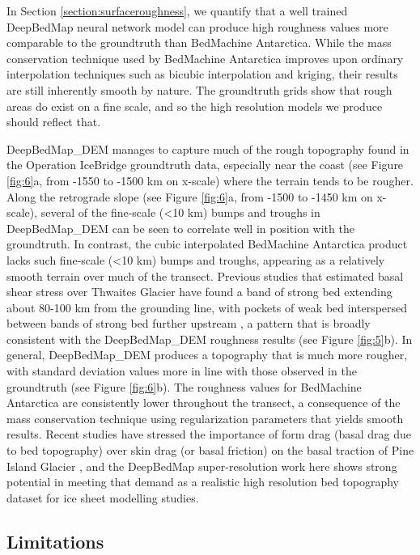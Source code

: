 \documentclass[tc, manuscript]{copernicus}
\begin{document}
In Section \ref{section:surfaceroughness}, we quantify that a well trained DeepBedMap neural network model can produce high roughness values more comparable to the groundtruth than BedMachine Antarctica.
While the mass conservation technique used by BedMachine Antarctica \citep{MorlighemDeepglacialtroughs2019} improves upon ordinary interpolation techniques such as bicubic interpolation and kriging, their results are still inherently smooth by nature.
The groundtruth grids show that rough areas do exist on a fine scale, and so the high resolution models we produce should reflect that.

DeepBedMap\_DEM manages to capture much of the rough topography found in the Operation IceBridge groundtruth data, especially near the coast (see Figure \ref{fig:6}a, from -1550 to -1500 km on x-scale) where the terrain tends to be rougher.
Along the retrograde slope (see Figure \ref{fig:6}a, from -1500 to -1450 km on x-scale), several of the fine-scale (<10 km) bumps and troughs in DeepBedMap\_DEM can be seen to correlate well in position with the groundtruth.
In contrast, the cubic interpolated BedMachine Antarctica product lacks such fine-scale (<10 km) bumps and troughs, appearing as a relatively smooth terrain over much of the transect.
Previous studies that estimated basal shear stress over Thwaites Glacier have found a band of strong bed extending about 80-100 km from the grounding line, with pockets of weak bed interspersed between bands of strong bed further upstream \citep{JoughinBasalconditionsPine2009,SergienkoRegularPatternsFrictional2013}, a pattern that is broadly consistent with the DeepBedMap\_DEM roughness results (see Figure \ref{fig:5}b).
In general, DeepBedMap\_DEM produces a topography that is much more rougher, with standard deviation values more in line with those observed in the groundtruth (see Figure \ref{fig:6}b).
The roughness values for BedMachine Antarctica are consistently lower throughout the transect, a consequence of the mass conservation technique using regularization parameters that yields smooth results.
Recent studies have stressed the importance of form drag (basal drag due to bed topography) over skin drag (or basal friction) on the basal traction of Pine Island Glacier \citep{BinghamDiverselandscapesPine2017,Kyrke-SmithRelevanceDetailBasal2018}, and the DeepBedMap super-resolution work here shows strong potential in meeting that demand as a realistic high resolution bed topography dataset for ice sheet modelling studies.

\subsection{Limitations}
\end{document}
